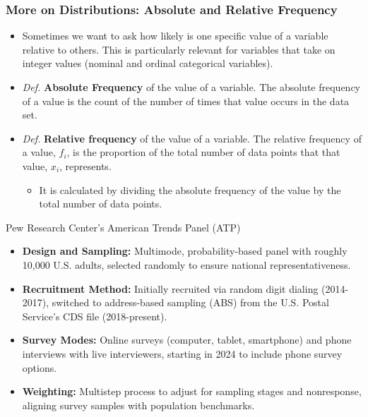 \documentclass[handout]{beamer} %
\begin{document}
\begin{frame}
\frametitle{More on Distributions: Absolute and Relative Frequency}
\begin{itemize}
\item Sometimes we want to ask how likely is one specific value of a variable relative to others. This is particularly relevant for variables that take on integer values (nominal and ordinal categorical variables).
\item \emph{Def.} \textbf{Absolute Frequency} of the value of a variable. The absolute frequency of a value is the count of the number of times that value occurs in the data set.
\item \emph{Def.} \textbf{Relative frequency} of the value of a variable. The relative frequency of a value, $f_i$, is the proportion of the total number of data points that that value, $x_i$, represents.
\begin{itemize}
    \item  It is calculated by dividing the absolute frequency of the value by the total number of data points.
\end{itemize}

\end{itemize}
\end{frame}


\begin{frame}{Pew Research Center's American Trends Panel (ATP)}
\begin{itemize}
    \item \textbf{Design and Sampling:} Multimode, probability-based panel with roughly 10,000 U.S. adults, selected randomly to ensure national representativeness.
    \item \textbf{Recruitment Method:} Initially recruited via random digit dialing (2014-2017), switched to address-based sampling (ABS) from the U.S. Postal Service's CDS file (2018-present).
    \item \textbf{Survey Modes:} Online surveys (computer, tablet, smartphone) and phone interviews with live interviewers, starting in 2024 to include phone survey options.
    \item \textbf{Weighting:} Multistep process to adjust for sampling stages and nonresponse, aligning survey samples with population benchmarks.
\end{itemize}
\end{frame}
\end{document}
